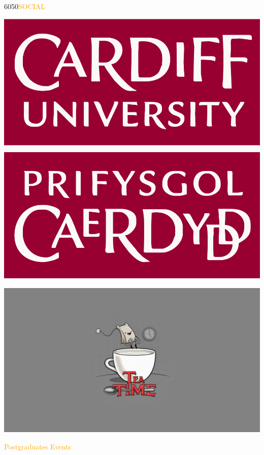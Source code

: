 \documentclass{beamer}
\makeatletter
\newcommand\HUGE{\@setfontsize\Huge{60}{50}}
\makeatother
\begin{document}
\begin{frame}
	\begin{center}
        \HUGE{\textcolor{orange}{SOCIAL}}
	\end{center}
\end{frame}

\begin{frame}
    \begin{center}
        \includegraphics[width=.5\textwidth]{static/cardiff_uni_logo.jpg}
    \end{center}
\end{frame}

\begin{frame}
    \begin{center}
        \includegraphics[width=\textwidth]{static/tea.jpg}
        
        \textcolor{orange}{Postgraduates Events}
    \end{center}
\end{frame}
\end{document}
